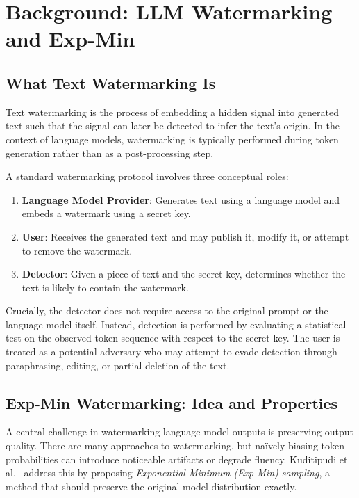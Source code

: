 \section{Background: LLM Watermarking and Exp-Min}

\subsection{What Text Watermarking Is}

Text watermarking is the process of embedding a hidden signal into generated text such that the signal can later be detected to infer the text's origin. In the context of language models, watermarking is typically performed during token generation rather than as a post-processing step.

A standard watermarking protocol involves three conceptual roles:
\begin{enumerate}
    \item \textbf{Language Model Provider}: Generates text using a language model and embeds a watermark using a secret key.
    \item \textbf{User}: Receives the generated text and may publish it, modify it, or attempt to remove the watermark.
    \item \textbf{Detector}: Given a piece of text and the secret key, determines whether the text is likely to contain the watermark.
\end{enumerate}

Crucially, the detector does not require access to the original prompt or the language model itself. Instead, detection is performed by evaluating a statistical test on the observed token sequence with respect to the secret key. The user is treated as a potential adversary who may attempt to evade detection through paraphrasing, editing, or partial deletion of the text.

\subsection{Exp-Min Watermarking: Idea and Properties}

A central challenge in watermarking language model outputs is preserving output quality. There are many approaches to watermarking, but naïvely biasing token probabilities can introduce noticeable artifacts or degrade fluency. Kuditipudi et al.~\cite{kuditipudi2023robustarticle} address this by proposing \emph{Exponential-Minimum (Exp-Min) sampling}, a method that should preserve the original model distribution exactly.

